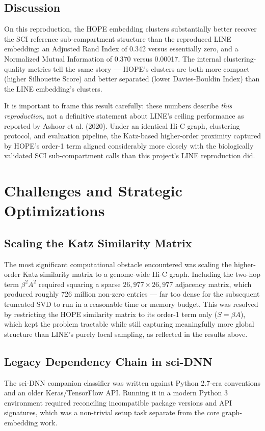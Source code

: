 \documentclass[12pt]{article}
\begin{document}
\subsection{Discussion}
On this reproduction, the HOPE embedding clusters substantially better recover the SCI reference
sub-compartment structure than the reproduced LINE embedding: an Adjusted Rand Index of
0.342 versus essentially zero, and a Normalized Mutual Information of 0.370 versus 0.00017.
The internal clustering-quality metrics tell the same story — HOPE's clusters are both more
compact (higher Silhouette Score) and better separated (lower Davies-Bouldin Index) than the
LINE embedding's clusters.

It is important to frame this result carefully: these numbers describe \textit{this reproduction},
not a definitive statement about LINE's ceiling performance as reported by Ashoor et al. (2020).
Under an identical Hi-C graph, clustering protocol, and evaluation pipeline, the Katz-based
higher-order proximity captured by HOPE's order-1 term aligned considerably more closely with
the biologically validated SCI sub-compartment calls than this project's LINE reproduction did.


\section{Challenges and Strategic Optimizations}

\subsection{Scaling the Katz Similarity Matrix}
The most significant computational obstacle encountered was scaling the higher-order Katz
similarity matrix to a genome-wide Hi-C graph. Including the two-hop term $\beta^2 A^2$ required
squaring a sparse $26{,}977 \times 26{,}977$ adjacency matrix, which produced roughly 726 million
non-zero entries — far too dense for the subsequent truncated SVD to run in a reasonable time or
memory budget. This was resolved by restricting the HOPE similarity matrix to its order-1 term
only ($S = \beta A$), which kept the problem tractable while still capturing meaningfully more
global structure than LINE's purely local sampling, as reflected in the results above.

\subsection{Legacy Dependency Chain in sci-DNN}
The sci-DNN companion classifier was written against Python 2.7-era conventions and an older
Keras/TensorFlow API. Running it in a modern Python 3 environment required reconciling
incompatible package versions and API signatures, which was a non-trivial setup task separate
from the core graph-embedding work.
\end{document}
